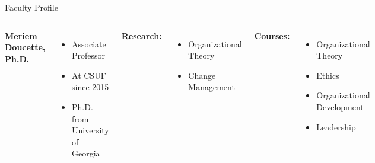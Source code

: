 \documentclass[10pt]{beamer}
\newlength{\imageheight}
\begin{document}
        \begin{frame}{Faculty Profile}
        \begin{columns}[T]
        \textbf{Meriem Doucette, Ph.D.}
        \begin{itemize}
        \item Associate Professor
        \item At CSUF since 2015
        \item Ph.D. from University of Georgia
        \end{itemize}
        
        \textbf{Research:} 
        \begin{itemize}
        \item Organizational Theory
        \item Change Management
        \end{itemize}

        \textbf{Courses:} 
        \begin{itemize}
        \item Organizational Theory
        \item Ethics
        \item Organizational Development
        \item Leadership
        \end{itemize}
        \vspace*{0.5cm}
        \includegraphics[height=\imageheight]{images/doucette.png}
        \end{columns}
        \end{frame}
        
\end{document}
